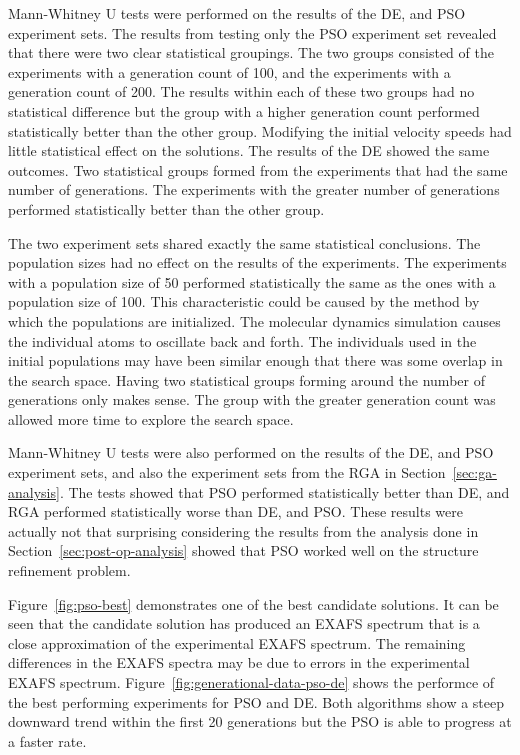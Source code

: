 Mann-Whitney U tests were performed on the results of the DE, and PSO experiment sets. The results from testing only the PSO experiment set revealed that there were two clear statistical groupings. The two groups consisted of the experiments with a generation count of 100, and the experiments with a generation count of 200. The results within each of these two groups had no statistical difference but the group with a higher generation count performed statistically better than the other group. Modifying the initial velocity speeds had little statistical effect on the solutions. The results of the DE showed the same outcomes. Two statistical groups formed from the experiments that had the same number of generations. The experiments with the greater number of generations performed statistically better than the other group.

The two experiment sets shared exactly the same statistical conclusions. The population sizes had no effect on the results of the experiments. The experiments with a population size of 50 performed statistically the same as the ones with a population size of 100. This characteristic could be caused by the method by which the populations are initialized. The molecular dynamics simulation causes the individual atoms to oscillate back and forth. The individuals used in the initial populations may have been similar enough that there was some overlap in the search space. Having two statistical groups forming around the number of generations only makes sense. The group with the greater generation count was allowed more time to explore the search space.

Mann-Whitney U tests were also performed on the results of the DE, and PSO experiment sets, and also the experiment sets from the RGA in Section~\ref{sec:ga-analysis}. The tests showed that PSO performed statistically better than DE, and RGA performed statistically worse than DE, and PSO. These results were actually not that surprising considering the results from the analysis done in Section~\ref{sec:post-op-analysis} showed that PSO worked well on the structure refinement problem.

Figure~\ref{fig:pso-best} demonstrates one of the best candidate solutions. It can be seen that the candidate solution has produced an EXAFS spectrum that is a close approximation of the experimental EXAFS spectrum. The remaining differences in the EXAFS spectra may be due to errors in the experimental EXAFS spectrum. Figure~\ref{fig:generational-data-pso-de} shows the performce of the best performing experiments for PSO and DE. Both algorithms show a steep downward trend within the first 20 generations but the PSO is able to progress at a faster rate.

